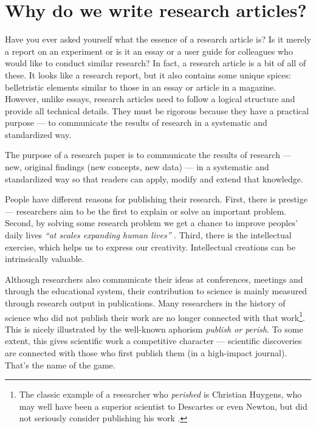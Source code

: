 \documentclass[graybox,envcountchap,sectrefs,UStrade]{svmono}
\begin{document}
\section{Why do we write research articles?}

Have you ever asked yourself what the essence of a research article is? Is it merely a report on an experiment or is it an essay or a user guide for colleagues who would like to conduct similar research? In fact, a research article is a bit of all of these. It looks like a research report, but it also contains some unique spices: belletristic elements similar to those in an essay or article in a magazine. However, unlike essays, research articles need to follow a logical structure and provide all technical details. They must be rigorous because they have a practical purpose --- to communicate the results of research in a systematic and standardized way.\par

\begin{svgraybox}
The purpose of a research paper is to communicate the results of research --- new, original findings (new concepts, new data) --- in a systematic and standardized way so that readers can apply, modify and extend that knowledge.
\end{svgraybox}\label{R:func}

People have different reasons for publishing their research. First, there is prestige --- researchers aim to be the first to explain or solve an important problem. Second, by solving some research problem we get a chance to improve peoples' daily lives \emph{``at scales expanding human lives''} \citep{AscheronKickuth2004}. Third, there is the intellectual exercise, which helps us to express our creativity. Intellectual creations can be intrinsically valuable. \par

Although researchers also communicate their ideas at conferences, meetings and through the educational system, their contribution to science is mainly measured through research output in publications. Many researchers in the history of science who did not publish their work are no longer connected with that work\footnote{The classic example of a researcher who \emph{perished} is Christian Huygens, who may well have been a superior scientist to Descartes or even Newton, but did not seriously consider publishing his work \citep{Crump2002}.}. This is nicely illustrated by the well-known aphorism \emph{publish or perish}. To some extent, this gives scientific work a competitive character --- scientific discoveries are connected with those who first publish them (in a high-impact journal). That's the name of the game.\par
\end{document}
